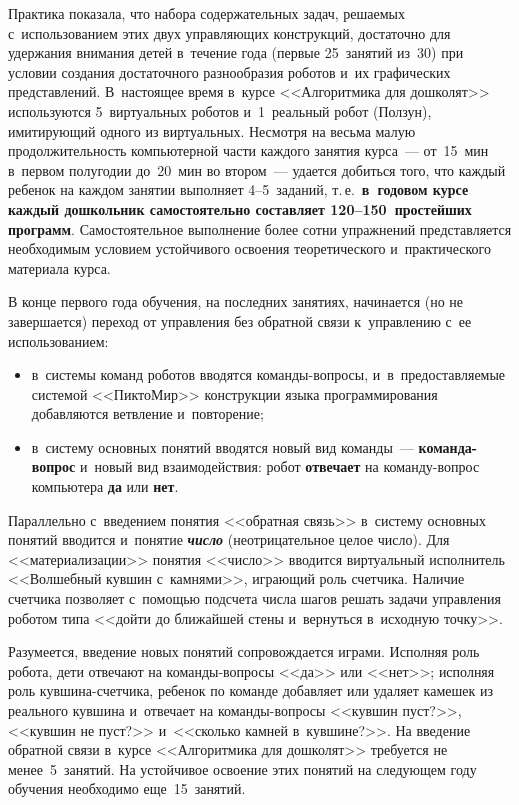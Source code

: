 \begin{multicols}{2}
  Практика показала, что набора содержательных задач, решаемых 
с~использованием этих двух управ\-ля\-ющих конструкций, достаточно для 
удержания внимания детей в~течение года (первые 25~занятий из~30) при 
условии создания достаточного разнообразия роботов и~их графических 
представлений. В~настоящее время в~курсе <<Алгоритмика для дошколят>> 
используются 5~виртуальных роботов и~1~реальный робот (Ползун), 
имитирующий одного из виртуальных. Несмотря на весьма малую 
продолжительность компьютерной части каждого занятия курса~--- 
от~15~мин в~первом полугодии до~20~мин во втором~--- удается добиться 
того, что каждый ребенок на каждом занятии выполняет 4--5~заданий, т.\,е.\ 
\textbf{в~годовом курсе каждый дошкольник самостоятельно составляет 
120--150~простейших программ}. Самостоятельное выполнение более сотни 
упражнений представляется необходимым условием устойчивого освоения 
теоретического и~практического материала курса. 
  
  В конце первого года обучения, на последних занятиях, начинается (но не 
завершается) переход от управления без обратной связи к~управлению с~ее 
использованием:
  \begin{itemize}
  \item в~системы команд роботов вводятся ко\-ман\-ды-во\-про\-сы, 
и~в~предоставляемые системой <<ПиктоМир>> конструкции языка 
программирования добавляются ветвление и~повторение;
  \item в~систему основных понятий вводятся новый вид команды~--- 
\textbf{ко\-ман\-да-во\-прос} и~новый вид взаимодействия: робот 
\textbf{отвечает} на ко\-ман\-ду-во\-прос компьютера \textbf{да} или 
\textbf{нет}.
  \end{itemize}
  
  Параллельно с~введением понятия <<обратная связь>> в~систему основных 
понятий вводится и~понятие {\bfseries\textit{число}} (неотрицательное целое 
число). Для <<материализации>> понятия <<число>> вводится виртуальный 
исполнитель <<Волшебный кувшин с~камнями>>, играющий роль счетчика. 
Наличие счетчика позволяет с~помощью подсчета числа шагов решать задачи 
управления роботом типа <<дойти до ближайшей стены и~вернуться 
в~исходную точку>>. 
{

}
  
  Разумеется, введение новых понятий со\-про\-вож\-да\-ет\-ся играми. Исполняя роль 
робота, дети отвечают на ко\-ман\-ды-во\-про\-сы <<да>> или <<нет>>; 
исполняя роль кув\-ши\-на-счет\-чи\-ка, ребенок по команде до\-бав\-ля\-ет или 
удаляет камешек из реального кувшина и~отвечает на ко\-ман\-ды-во\-про\-сы 
<<кувшин пуст?>>, <<кувшин не пуст?>> и~<<сколько камней в~кувшине?>>. 
На введение обратной связи в~курсе <<Алгоритмика для дошколят>> требуется 
не менее~5~занятий. На устойчивое освоение этих понятий на следующем году 
обучения необходимо еще~15~занятий. 
{

}
\end{multicols}
